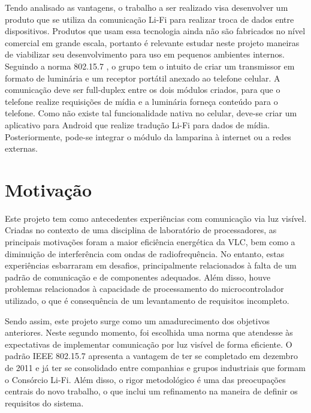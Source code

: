 	Tendo analisado as vantagens, o trabalho a ser realizado visa desenvolver um produto que se utiliza da comunicação Li-Fi para realizar troca de dados entre dispositivos. Produtos que usam essa tecnologia ainda não são fabricados no nível comercial em grande escala, portanto é relevante estudar neste projeto maneiras de viabilizar seu desenvolvimento para uso em pequenos ambientes internos. Seguindo a norma 802.15.7 \cite{lifi-standard}, o grupo tem o intuito de criar um transmissor em formato de luminária e um receptor portátil anexado ao telefone celular. A comunicação deve ser full-duplex entre os dois módulos criados, para que o telefone realize requisições de mídia e a luminária forneça conteúdo para o telefone. Como não existe tal funcionalidade nativa no celular, deve-se criar um aplicativo para Android que realize tradução Li-Fi para dados de mídia. Posteriormente, pode-se integrar o módulo da lamparina à internet ou a redes externas.

	
	\section{Motivação}\label{sec-motivacao}
	
	Este projeto tem como antecedentes experiências com comunicação via luz visível. Criadas no contexto de uma disciplina de laboratório de processadores, as principais motivações foram a maior eficiência energética da VLC, bem como a diminuição de interferência com ondas de radiofrequência. No entanto, estas experiências esbarraram em desafios, principalmente relacionados à falta de um padrão de comunicação e de componentes adequados. Além disso, houve problemas relacionados à capacidade de processamento do microcontrolador utilizado, o que é consequência de um levantamento de requisitos incompleto.
	
	Sendo assim, este projeto surge como um amadurecimento dos objetivos anteriores. Neste segundo momento, foi escolhida uma norma que atendesse às expectativas de implementar comunicação por luz visível de forma eficiente. O padrão IEEE 802.15.7 apresenta a vantagem de ter se completado em dezembro de 2011 e já ter se consolidado entre companhias e grupos industriais que formam o Consórcio Li-Fi. Além disso, o rigor metodológico é uma das preocupações centrais do novo trabalho, o que inclui um refinamento na maneira de definir os requisitos do sistema.
	
	